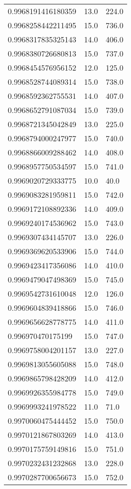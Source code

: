 \begin{center}
\begin{supertabular}[H]{p{0.30\textwidth}p{0.05\textwidth}p{0.05\textwidth}}
0.9968191416180359 & 13.0 & 224.0 \\ 
0.9968258442211495 & 15.0 & 736.0 \\ 
0.9968317835325143 & 14.0 & 406.0 \\ 
0.9968380726680813 & 15.0 & 737.0 \\ 
0.9968454576956152 & 12.0 & 125.0 \\ 
0.9968528744089314 & 15.0 & 738.0 \\ 
0.9968592362755531 & 14.0 & 407.0 \\ 
0.9968652791087034 & 15.0 & 739.0 \\ 
0.9968721345042849 & 13.0 & 225.0 \\ 
0.9968794000247977 & 15.0 & 740.0 \\ 
0.9968866009288462 & 14.0 & 408.0 \\ 
0.9968957750534597 & 15.0 & 741.0 \\ 
0.9969020729333775 & 10.0 & 40.0 \\ 
0.9969083281959811 & 15.0 & 742.0 \\ 
0.9969172108892336 & 14.0 & 409.0 \\ 
0.9969240174536962 & 15.0 & 743.0 \\ 
0.9969307434145707 & 13.0 & 226.0 \\ 
0.9969369620533906 & 15.0 & 744.0 \\ 
0.9969423417356086 & 14.0 & 410.0 \\ 
0.9969479047498369 & 15.0 & 745.0 \\ 
0.9969542731610048 & 12.0 & 126.0 \\ 
0.9969604839418866 & 15.0 & 746.0 \\ 
0.9969656628778775 & 14.0 & 411.0 \\ 
0.996970470175199 & 15.0 & 747.0 \\ 
0.9969758004201157 & 13.0 & 227.0 \\ 
0.9969813055605088 & 15.0 & 748.0 \\ 
0.9969865798428209 & 14.0 & 412.0 \\ 
0.9969926355984778 & 15.0 & 749.0 \\ 
0.9969993241978522 & 11.0 & 71.0 \\ 
0.9970060475444452 & 15.0 & 750.0 \\ 
0.9970121867803269 & 14.0 & 413.0 \\ 
0.9970175759149816 & 15.0 & 751.0 \\ 
0.9970232431232868 & 13.0 & 228.0 \\ 
0.9970287700656673 & 15.0 & 752.0 \\ 

\end{supertabular}
\end{center}
